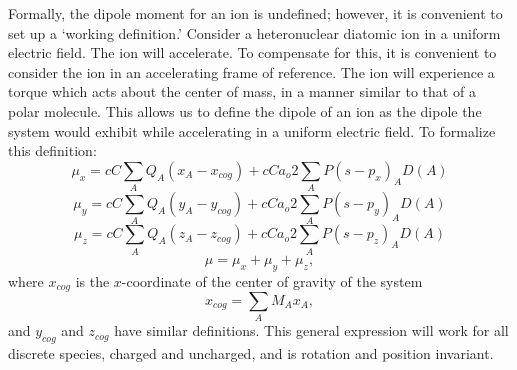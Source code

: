 Formally, the dipole moment for an ion is undefined; however, it is convenient
to set up a `working definition.'  Consider a heteronuclear diatomic ion in a
uniform electric field.  The ion will accelerate.  To compensate for this, it
is convenient to consider the ion in an accelerating frame of reference.  The
ion will  experience a torque which acts about the center of mass, in a manner
similar to that of a polar molecule.  This allows us to define the dipole of an
ion as the dipole the system would exhibit while accelerating in a uniform
electric field.  To formalize this definition:
\begin{equation}
\mu_x  = cC\sum_AQ_A(x_A-x_{cog}) + cCa_o2\sum_A P(s-p_x)_AD(A)
\end  {equation}
\begin{equation}
\mu_y  = cC\sum_AQ_A(y_A-y_{cog}) + cCa_o2\sum_A P(s-p_y)_AD(A)
\end  {equation}
\begin{equation}
\mu_z  = cC\sum_AQ_A(z_A-z_{cog}) + cCa_o2\sum_A P(s-p_z)_AD(A)
\end  {equation}
\begin{equation}
\mu = \mu_x+\mu_y+\mu_z,
\end  {equation}
where $x_{cog}$ is the $x$-coordinate of the center of gravity of the system
\begin{equation}
x_{cog} = \sum_AM_Ax_A,
\end  {equation}
and $y_{cog}$ and $z_{cog}$ have similar definitions.  This general expression
will work for all discrete species, charged and uncharged, and is rotation and
position invariant.



